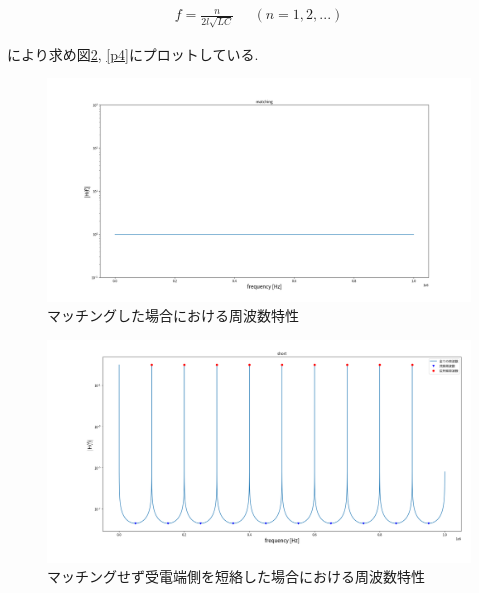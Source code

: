 \documentclass[a4j,12pt,]{jarticle}
\begin{document}
\begin{eqnarray}
  f =  \frac{n}{2l\sqrt{LC}}\;\;\;\;\;(n = 1, 2, ...)
\end{eqnarray}

により求め図\ref{p3}, \ref{p4}にプロットしている.

\begin{figure}[H]
  \begin{center}
    \includegraphics[width=160mm]{report/matchingWithoutDampingConstantsLogScale.png}
    \caption{マッチングした場合における周波数特性}
    \label{p2}
  \end{center}
\end{figure}

\begin{figure}[H]
  \begin{center}
    \includegraphics[width=160mm]{report/shortCircuitAtReceivingEndWithoutDecayConstantLogScale.png}
    \caption{マッチングせず受電端側を短絡した場合における周波数特性}
    \label{p3}
  \end{center}
\end{figure}
\end{document}
